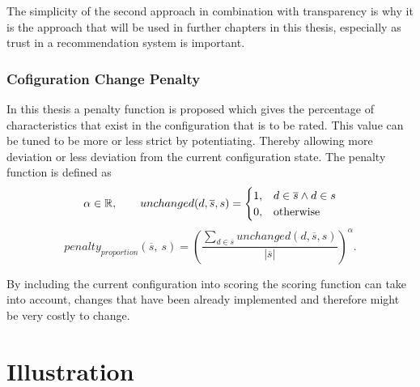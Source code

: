 The simplicity of the second approach in combination with transparency is why it is the approach that will be used in further chapters in this thesis, especially as trust in a recommendation system is important.

\subsubsection{Cofiguration Change Penalty}
\label{subsubsec:Concept:SolutionGeneration:ScoringFunction:Penalty}

In this thesis a penalty function is proposed which gives the percentage of characteristics that exist in the configuration that is to be rated. This value can be tuned to be more or less strict by potentiating. Thereby allowing more deviation or less deviation from the current configuration state. The penalty function is defined as
\begin{equation}
    \notag \alpha \in \mathbb{R}, \qquad     unchanged(d,\overline{s}, s) = 
    \begin{cases}
      1, & d \in \overline{s} \land d \in s \\
      0, & \text{otherwise}
    \end{cases}
\end{equation}
\begin{equation}
    penalty_{proportion}(\overline{s},\ s) =  \left(\frac{\sum_{d \in \overline{s}} unchanged(d,\overline{s}, s)}{|\overline{s}|}\right)^\alpha.
\end{equation}

By including the current configuration into scoring the scoring function can take into account, changes that have been already implemented and therefore might be very costly to change.

\section{Illustration}
\label{sec:Concept:Illustration}

